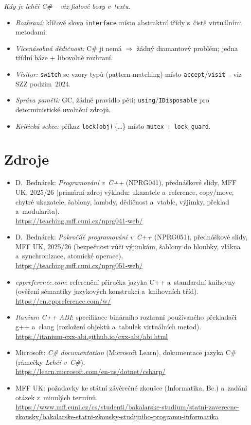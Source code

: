 \documentclass[11pt,a4paper]{article}
\newcommand{\cd}{\lstinline[style=cpp]}
\begin{document}
\begin{poznamka}
\smallskip
\emph{Kdy je lehčí C\# -- viz fialové boxy v~textu.}
\begin{itemize}
  \item \emph{Rozhraní:} klíčové slovo \texttt{interface} místo abstraktní třídy s~čistě virtuálními metodami.
  \item \emph{Vícenásobná dědičnost:} C\# ji nemá $\Rightarrow$ žádný diamantový problém; jedna třídní báze + libovolně rozhraní.
  \item \emph{Visitor:} \texttt{switch} se vzory typů (pattern matching) místo \texttt{accept}/\texttt{visit} -- viz SZZ podzim~2024.
  \item \emph{Správa paměti:} GC, žádné pravidlo pěti; \texttt{using}/\texttt{IDisposable} pro deterministické uvolnění zdrojů.
  \item \emph{Kritická sekce:} příkaz \texttt{lock(obj)}\,\{\dots\} místo \cd{mutex} + \cd{lock_guard}.
\end{itemize}
\end{poznamka}

\section*{Zdroje}

{\raggedright
\begin{itemize}
  \item D.~Bednárek: \emph{Programování v~C++} (NPRG041), přednáškové slidy, MFF UK, 2025/26 (primární zdroj výkladu: ukazatele a~reference, copy/move, chytré ukazatele, šablony, lambdy, dědičnost a~vtable, výjimky, překlad a~modularita).\\ \url{https://teaching.mff.cuni.cz/nprg041-web/}
  \item D.~Bednárek: \emph{Pokročilé programování v~C++} (NPRG051), přednáškové slidy, MFF UK, 2025/26 (bezpečnost vůči výjimkám, šablony do hloubky, vlákna a~synchronizace, atomické operace).\\ \url{https://teaching.mff.cuni.cz/nprg051-web/}
  \item \emph{cppreference.com}: referenční příručka jazyka C++ a~standardní knihovny (ověření sémantiky jazykových konstrukcí a~knihovních tříd).\\ \url{https://en.cppreference.com/w/}
  \item \emph{Itanium C++ ABI}: specifikace binárního rozhraní používaného překladači g++ a~clang (rozložení objektů a~tabulek virtuálních metod).\\ \url{https://itanium-cxx-abi.github.io/cxx-abi/abi.html}
  \item Microsoft: \emph{C\# documentation} (Microsoft Learn), dokumentace jazyka C\# (rámečky \emph{Lehčí v~C\#}).\\ \url{https://learn.microsoft.com/en-us/dotnet/csharp/}
  \item MFF UK: požadavky ke státní závěrečné zkoušce (Informatika, Bc.) a~zadání otázek z~minulých termínů.\\ \url{https://www.mff.cuni.cz/cs/studenti/bakalarske-studium/statni-zaverecne-zkousky/bakalarske-statni-zkousky-studijniho-programu-informatika}
\end{itemize}
\par}
\end{document}
